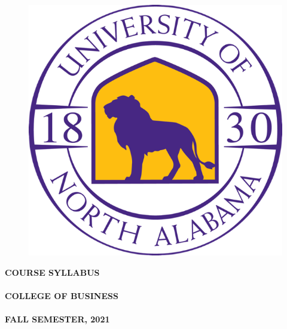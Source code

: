 \documentclass[12pt]{letter}
\newlength{\logowidth}
\newcommand{\customhref}[2]{
	\href{#1}{\color{blue}\burl{#2}}	
}
\newcommand{\semester}{FALL SEMESTER, 2021}
\begin{document}
\thispagestyle{empty}


\begin{large}


\begin{figure}
 \includegraphics[width=\logowidth]{img/approved_una_logo}
\end{figure}

\textbf{COURSE SYLLABUS}\\ \\
\textbf{COLLEGE OF BUSINESS}\\ \\
\textbf{\semester}
 
  \vspace*{28pt}
  \textbf{\course} \\ \\ 
  \textbf{\coursetitle}
\end{large}
\end{document}
